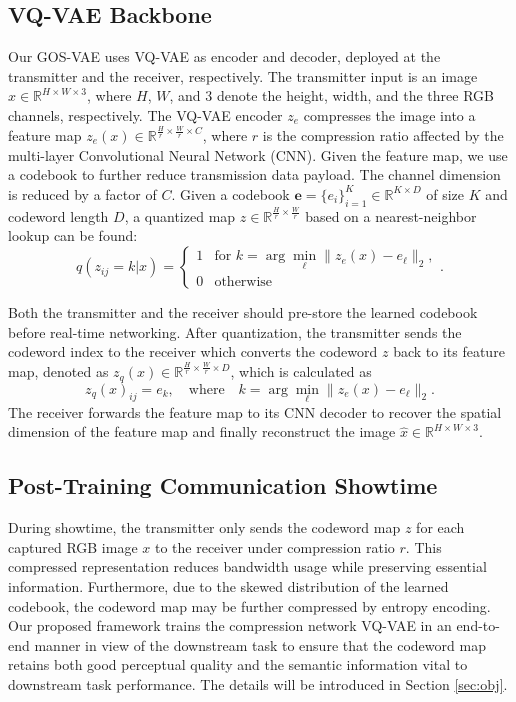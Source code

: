 \vspace*{-2mm}
\subsection{VQ-VAE Backbone}
Our GOS-VAE uses VQ-VAE as encoder and decoder, deployed at the transmitter and the receiver, respectively.
The transmitter input is an image $x \in \mathbb{R}^{H \times W \times 3}$, where $H$, $W$, and $3$ denote the height, width, and the three RGB channels, respectively. The VQ-VAE encoder $z_{e}$ compresses the image into a feature map $z_{e}(x) \in \mathbb{R}^{\frac{H}{r} \times \frac{W}{r} \times C}$, where $r$ is the compression ratio affected by the multi-layer Convolutional Neural Network (CNN). Given the feature map, we use a codebook to further reduce transmission data payload. The channel dimension is reduced by a factor of $C$. Given a codebook $\textbf{e}=\{e_i\}_{i=1}^{K} \in \mathbb{R}^{K \times D}$ of size $K$ and codeword length $D$, a quantized map $z \in \mathbb{R}^{\frac{H}{r} \times \frac{W}{r}}$ based on a nearest-neighbor lookup can be found:
\begin{equation}
q(z_{ij} = k|x) = 
\begin{cases} 
1 & \text{for } k = \arg \min_{\ell} \| z_e(x) - e_{\ell} \|_2 , \\
0 & \text{otherwise}
\end{cases}.
\end{equation}

Both the transmitter and the receiver should
pre-store the learned codebook before real-time networking.
After quantization, the transmitter sends the codeword index to the receiver which converts the
codeword $z$ back to its feature map, denoted as $z_{q}(x) \in \mathbb{R}^{\frac{H}{r} \times \frac{W}{r} \times D}$, which is calculated as
\begin{equation}
z_q(x)_{ij} = e_k, \quad \text{where} \quad k = \arg \min_{\ell} \| z_e(x) - e_{\ell} \|_2 .
\end{equation}
The receiver forwards the feature map to its CNN decoder to recover the spatial dimension of the feature map and finally reconstruct the image $\hat{x} \in \mathbb{R}^{H \times W \times 3}$.

\vspace*{-2mm}
\subsection{Post-Training Communication Showtime}
During showtime, the transmitter only sends the codeword map $z$ for each captured RGB image $x$ to the receiver under compression ratio $r$. This compressed representation reduces bandwidth usage while preserving essential information. {Furthermore, due to the skewed distribution of the learned codebook, the codeword map may be further compressed by entropy encoding.} Our proposed framework
trains the compression network VQ-VAE in an end-to-end manner in view of the downstream task to ensure that 
the codeword map retains both good perceptual quality and the semantic information vital to
downstream task performance. The details will be introduced in Section \ref{sec:obj}.




